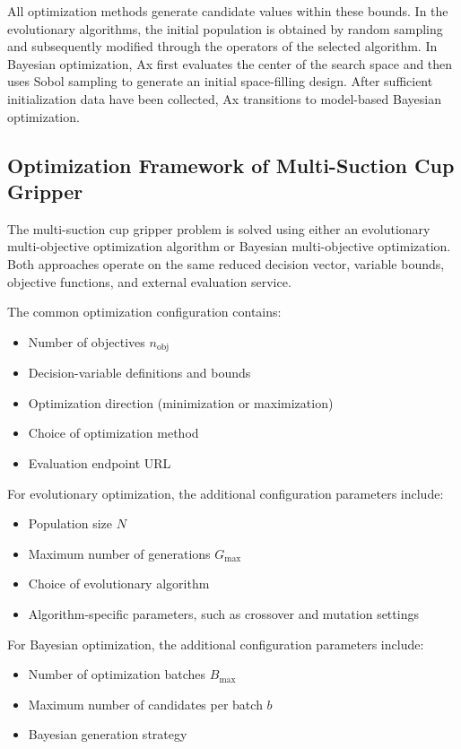All optimization methods generate candidate values within these bounds. In the evolutionary
algorithms, the initial population is obtained by random sampling and subsequently modified through
the operators of the selected algorithm. In Bayesian optimization, Ax first evaluates the center of
the search space and then uses Sobol sampling to generate an initial space-filling design. After
sufficient initialization data have been collected, Ax transitions to model-based Bayesian
optimization.

\subsection{Optimization Framework of Multi-Suction Cup Gripper}

The multi-suction cup gripper problem is solved using either an evolutionary multi-objective
optimization algorithm or Bayesian multi-objective optimization. Both approaches operate on the same
reduced decision vector, variable bounds, objective functions, and external evaluation service.

The common optimization configuration contains:
\begin{itemize}
    \item Number of objectives $n_{\text{obj}}$
    \item Decision-variable definitions and bounds
    \item Optimization direction (minimization or maximization)
    \item Choice of optimization method
    \item Evaluation endpoint URL
\end{itemize}

For evolutionary optimization, the additional configuration parameters include:
\begin{itemize}
    \item Population size $N$
    \item Maximum number of generations $G_{\max}$
    \item Choice of evolutionary algorithm
    \item Algorithm-specific parameters, such as crossover and mutation settings
\end{itemize}

For Bayesian optimization, the additional configuration parameters include:
\begin{itemize}
    \item Number of optimization batches $B_{\max}$
    \item Maximum number of candidates per batch $b$
    \item Bayesian generation strategy
\end{itemize}

